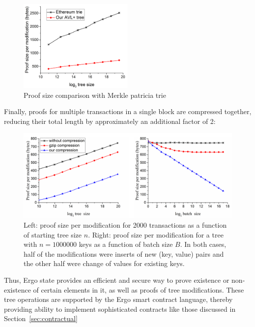 
\begin{figure}[H]
    \centering
    \includegraphics[width=0.5\textwidth]{img/proofSize.png}
    \caption{Proof size comparison with Merkle patricia trie
    \label{fig:proofSize} }
\end{figure}

Finally, proofs for multiple transactions in a single block are compressed together, reducing their total length
by approximately an additional factor of 2:

\begin{figure}[H]
    \centering
    \includegraphics[width=\textwidth]{img/compression.png}
    \caption{Left: proof size per modification for 2000 transactions as a function of starting tree size $n$.
    Right: proof size per modification for a tree with $n = 1 000 000$ keys as a function of batch size $B$.
    In both cases, half of the modifications were inserts of new (key, value) pairs and the other half were change of values for existing keys.
    \label{fig:compression} }
\end{figure}

Thus, Ergo state provides an efficient and secure way to prove existence or non-existence of certain elements in
it, as well as proofs of tree modifications.
These tree operations are supported by the Ergo smart contract language, thereby providing ability to implement sophisticated contracts like those discussed in Section~\ref{sec:contractual}





